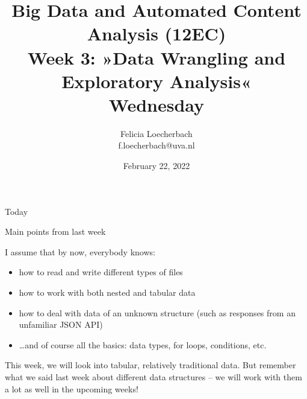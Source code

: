 

\graphicspath{{../../resources/img/}}




\title[Big Data and Automated Content Analysis]{\textbf{Big Data and Automated Content Analysis (12EC)} 
\\Week 3: »Data Wrangling and Exploratory Analysis«
\\Wednesday}
\author[Felicia Loecherbach]{Felicia Loecherbach\\ \footnotesize{f.loecherbach@uva.nl\\}}
\date{February 22, 2022}


\begin{frame}{}
	\titlepage
\end{frame}

\begin{frame}{Today}
	\tableofcontents
\end{frame}





\begin{frame}{Main points from last week}

\begin{alertblock}{I assume that by now, everybody knows:}
\begin{itemize}
\item how to read and write different types of files
\item how to work with both nested and tabular data
\item how to deal with data of an unknown structure (such as responses from an unfamiliar JSON API)
\item \ldots and of course all the basics: data types, for loops, conditions, etc.
\end{itemize}
\end{alertblock}
\end{frame}


\begin{frame}[standout]
This week, we will look into tabular, relatively traditional data. But remember what we said last week about different data structures -- we will work with them a lot as well in the upcoming weeks!
\end{frame}











